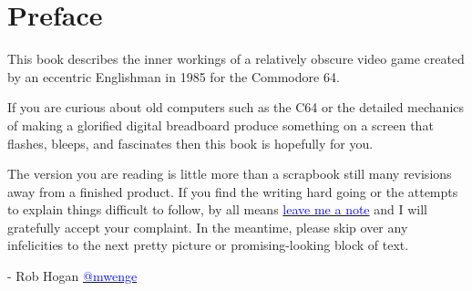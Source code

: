 \chapter{Preface} 
This book describes the inner workings of a relatively obscure video game created
by an eccentric Englishman in 1985 for the Commodore 64.

If you are curious about old computers such as the C64 or the detailed mechanics
of making a glorified digital breadboard produce something on a screen that flashes, bleeps,
and fascinates then this book is hopefully for you.

The version you are reading is little more than a scrapbook still many revisions away from a
finished product. If you find the writing hard going or the attempts to explain things difficult
to follow, by all means \href{https://github.com/mwenge/iatheory/issues}{\textcolor{blue}{leave me a note}} and
I will gratefully accept your complaint. In the meantime, please skip over any infelicities
to the next pretty picture or promising-looking block of text.

- Rob Hogan \href{https://mastodon.social/@mwenge}{\textcolor{blue}{@mwenge}}
